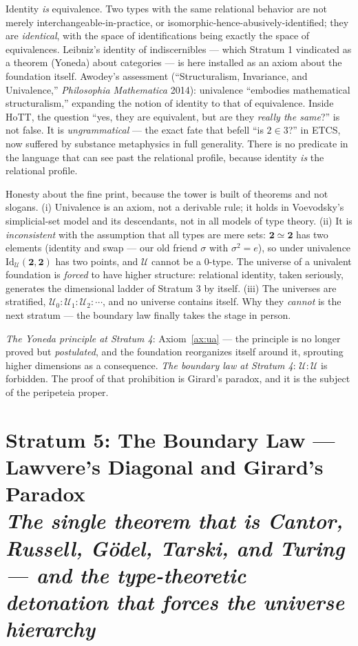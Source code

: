 \documentclass[11pt]{article}
\theoremstyle{plain}
\theoremstyle{definition}
\theoremstyle{remark}
\newcommand{\U}{\mathcal{U}}
\newcommand{\stratum}[2]{\section{#1 \\ {\normalsize\normalfont\itshape #2}}}
\begin{document}
Identity \emph{is} equivalence. Two types with the same relational behavior are not merely interchangeable-in-practice, or isomorphic-hence-abusively-identified; they are \emph{identical}, with the space of identifications being exactly the space of equivalences. Leibniz's identity of indiscernibles --- which Stratum 1 vindicated as a theorem (Yoneda) about categories --- is here installed as an axiom about the foundation itself. Awodey's assessment (``Structuralism, Invariance, and Univalence,'' \emph{Philosophia Mathematica} 2014): univalence ``embodies mathematical structuralism,'' expanding the notion of identity to that of equivalence. Inside HoTT, the question ``yes, they are equivalent, but are they \emph{really the same}?'' is not false. It is \emph{ungrammatical} --- the exact fate that befell ``is $2 \in 3$?'' in ETCS, now suffered by substance metaphysics in full generality. There is no predicate in the language that can see past the relational profile, because identity \emph{is} the relational profile.

Honesty about the fine print, because the tower is built of theorems and not slogans. (i) Univalence is an axiom, not a derivable rule; it holds in Voevodsky's simplicial-set model and its descendants, not in all models of type theory. (ii) It is \emph{inconsistent} with the assumption that all types are mere sets: $\mathbf{2} \simeq \mathbf{2}$ has two elements (identity and swap --- our old friend $\sigma$ with $\sigma^2 = e$), so under univalence $\mathrm{Id}_\U(\mathbf{2},\mathbf{2})$ has two points, and $\U$ cannot be a 0-type. The universe of a univalent foundation is \emph{forced} to have higher structure: relational identity, taken seriously, generates the dimensional ladder of Stratum 3 by itself. (iii) The universes are stratified, $\U_0 : \U_1 : \U_2 : \cdots$, and no universe contains itself. Why they \emph{cannot} is the next stratum --- the boundary law finally takes the stage in person.

\begin{refrain}
\emph{The Yoneda principle at Stratum 4}: Axiom~\ref{ax:ua} --- the principle is no longer proved but \emph{postulated}, and the foundation reorganizes itself around it, sprouting higher dimensions as a consequence. \emph{The boundary law at Stratum 4}: $\U : \U$ is forbidden. The proof of that prohibition is Girard's paradox, and it is the subject of the peripeteia proper.
\end{refrain}

\stratum{Stratum 5: The Boundary Law --- Lawvere's Diagonal and Girard's Paradox}{The single theorem that is Cantor, Russell, G\"odel, Tarski, and Turing --- and the type-theoretic detonation that forces the universe hierarchy}
\end{document}
